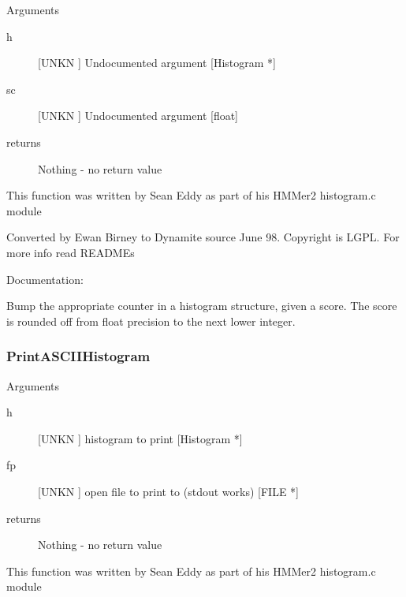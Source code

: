 Arguments
\begin{description}
\item[h] [UNKN ] Undocumented argument [Histogram *]
\item[sc] [UNKN ] Undocumented argument [float]
\item[returns] Nothing - no return value
\end{description}


This function was written by Sean Eddy
as part of his HMMer2 histogram.c module


Converted by Ewan Birney to Dynamite source June 98.
Copyright is LGPL. For more info read READMEs


Documentation:


Bump the appropriate counter in a histogram
structure, given a score. The score is
rounded off from float precision to the
next lower integer.


\subsubsection{PrintASCIIHistogram}

Arguments
\begin{description}
\item[h] [UNKN ] histogram to print [Histogram *]
\item[fp] [UNKN ] open file to print to (stdout works) [FILE *]
\item[returns] Nothing - no return value
\end{description}


This function was written by Sean Eddy
as part of his HMMer2 histogram.c module


